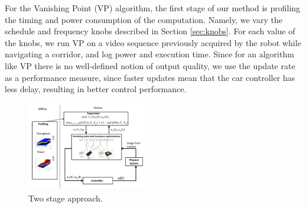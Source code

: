 For the Vanishing Point (VP) algorithm, the first stage of our method is profiling the timing and power consumption of the computation.
Namely, we vary the schedule and frequency knobs described in Section \ref{sec:knobs}.
For each value of the knobs, we run VP on a video sequence previously acquired by the robot while navigating a corridor, and log power and execution time.
Since for an algorithm like VP there is no well-defined notion of output quality, we use the update rate as a performance measure, since faster updates mean that the car controller has less delay, resulting in better control performance. 

\begin{figure}[t]
	\centering
	\includegraphics[width=0.46\textwidth]{Figs/bigFig.pdf}
	\caption{Two stage approach.}
	\label{fig:juicyj}%
\end{figure} 


